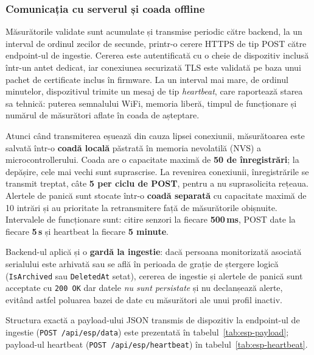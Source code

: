 \documentclass[12pt,a4paper,twoside]{article}
\begin{document}
\subsubsection{Comunicația cu serverul și coada offline}

Măsurătorile validate sunt acumulate și transmise periodic către backend, la un interval de ordinul zecilor de secunde, printr-o cerere HTTPS de tip POST către endpoint-ul de ingestie. Cererea este autentificată cu o cheie de dispozitiv inclusă într-un antet dedicat, iar conexiunea securizată TLS este validată pe baza unui pachet de certificate inclus în firmware. La un interval mai mare, de ordinul minutelor, dispozitivul trimite un mesaj de tip \textit{heartbeat}, care raportează starea sa tehnică: puterea semnalului WiFi, memoria liberă, timpul de funcționare și numărul de măsurători aflate în coada de așteptare.

Atunci când transmiterea eșuează din cauza lipsei conexiunii, măsurătoarea este salvată într-o \textbf{coadă locală} păstrată în memoria nevolatilă (NVS) a microcontrollerului. Coada are o capacitate maximă de \textbf{50 de înregistrări}; la depășire, cele mai vechi sunt suprascrise. La revenirea conexiunii, înregistrările se transmit treptat, câte \textbf{5 per ciclu de POST}, pentru a nu suprasolicita rețeaua. Alertele de panică sunt stocate într-o \textbf{coadă separată} cu capacitate maximă de 10 intrări și au prioritate la retransmitere față de măsurătorile obișnuite. Intervalele de funcționare sunt: citire senzori la fiecare \textbf{500\,ms}, POST date la fiecare \textbf{5\,s} și heartbeat la fiecare \textbf{5 minute}.

Backend-ul aplică și o \textbf{gardă la ingestie}: dacă persoana monitorizată asociată serialului este arhivată sau se află în perioada de grație de ștergere logică (\texttt{IsArchived} sau \texttt{DeletedAt} setat), cererea de ingestie și alertele de panică sunt acceptate cu \texttt{200 OK} dar datele \emph{nu sunt persistate} și nu declanșează alerte, evitând astfel poluarea bazei de date cu măsurători ale unui profil inactiv.

Structura exactă a payload-ului JSON transmis de dispozitiv la endpoint-ul de ingestie (\texttt{POST /api/esp/data}) este prezentată în tabelul~\ref{tab:esp-payload}; payload-ul heartbeat (\texttt{POST /api/esp/heartbeat}) în tabelul~\ref{tab:esp-heartbeat}.
\end{document}
